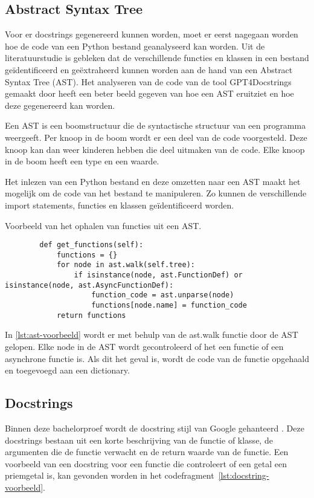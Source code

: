 \subsection{Abstract Syntax Tree}
\label{sec:bestanddocumentatie-ast}
Voor er docstrings gegenereerd kunnen worden, moet er eerst nagegaan worden hoe de code van een Python bestand geanalyseerd kan worden.
Uit de literatuurstudie is gebleken dat de verschillende functies en klassen in een bestand geïdentificeerd en geëxtraheerd kunnen worden aan de hand van een Abstract Syntax Tree (AST).
Het analyseren van de code van de tool GPT4Docstrings gemaakt door \textcite{Trofficus2023} heeft een beter beeld gegeven van hoe een AST eruitziet en hoe deze gegenereerd kan worden.

Een AST is een boomstructuur die de syntactische structuur van een programma weergeeft.
Per knoop in de boom wordt er een deel van de code voorgesteld. 
Deze knoop kan dan weer kinderen hebben die deel uitmaken van de code.
Elke knoop in de boom heeft een type en een waarde.

Het inlezen van een Python bestand en deze omzetten naar een AST maakt het mogelijk om de code van het bestand te manipuleren.
Zo kunnen de verschillende import statements, functies en klassen geïdentificeerd worden.

\begin{listing}
    \caption[Ophalen functies uit AST]{Voorbeeld van het ophalen van functies uit een AST.}
    \label{lst:ast-voorbeeld}
    \begin{verbatim}
        def get_functions(self):
            functions = {}
            for node in ast.walk(self.tree):
                if isinstance(node, ast.FunctionDef) or isinstance(node, ast.AsyncFunctionDef):
                    function_code = ast.unparse(node)
                    functions[node.name] = function_code
            return functions
    \end{verbatim}
\end{listing}

In \ref{lst:ast-voorbeeld} wordt er met behulp van de ast.walk functie door de AST gelopen.
Elke node in de AST wordt gecontroleerd of het een functie of een asynchrone functie is.
Als dit het geval is, wordt de code van de functie opgehaald en toegevoegd aan een dictionary.

\subsection{Docstrings}
\label{sec:bestanddocumentatie-docstrings}
Binnen deze bachelorproef wordt de docstring stijl van Google gehanteerd \autocite{GPT2024}.
Deze docstrings bestaan uit een korte beschrijving van de functie of klasse, de argumenten die de functie verwacht en de return waarde van de functie.
Een voorbeeld van een docstring voor een functie die controleert of een getal een priemgetal is, kan gevonden worden in het codefragment~\ref{lst:docstring-voorbeeld}.


